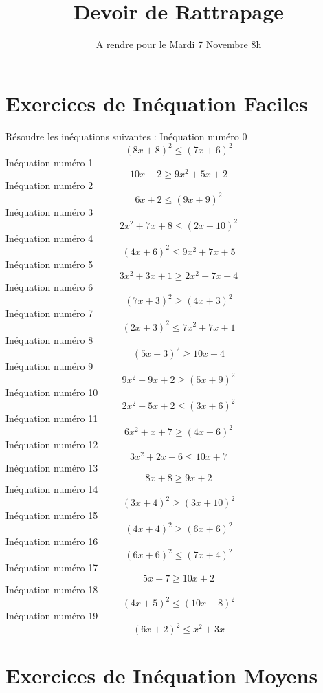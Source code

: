 \documentclass{article}
\title{Devoir de Rattrapage}
\date{A rendre pour le Mardi 7 Novembre 8h}\usepackage{natbib}
\begin{document}
\maketitle
 \section{Exercices de In\'equation Faciles}

 R\'esoudre les in\'equations suivantes : 
In\'equation num\'ero 0 \[\left(8 x + 8\right)^{2} \leq \left(7 x + 6\right)^{2}\]In\'equation num\'ero 1 \[10 x + 2 \geq 9 x^{2} + 5 x + 2\]In\'equation num\'ero 2 \[6 x + 2 \leq \left(9 x + 9\right)^{2}\]In\'equation num\'ero 3 \[2 x^{2} + 7 x + 8 \leq \left(2 x + 10\right)^{2}\]In\'equation num\'ero 4 \[\left(4 x + 6\right)^{2} \leq 9 x^{2} + 7 x + 5\]In\'equation num\'ero 5 \[3 x^{2} + 3 x + 1 \geq 2 x^{2} + 7 x + 4\]In\'equation num\'ero 6 \[\left(7 x + 3\right)^{2} \geq \left(4 x + 3\right)^{2}\]In\'equation num\'ero 7 \[\left(2 x + 3\right)^{2} \leq 7 x^{2} + 7 x + 1\]In\'equation num\'ero 8 \[\left(5 x + 3\right)^{2} \geq 10 x + 4\]In\'equation num\'ero 9 \[9 x^{2} + 9 x + 2 \geq \left(5 x + 9\right)^{2}\]In\'equation num\'ero 10 \[2 x^{2} + 5 x + 2 \leq \left(3 x + 6\right)^{2}\]In\'equation num\'ero 11 \[6 x^{2} + x + 7 \geq \left(4 x + 6\right)^{2}\]In\'equation num\'ero 12 \[3 x^{2} + 2 x + 6 \leq 10 x + 7\]In\'equation num\'ero 13 \[8 x + 8 \geq 9 x + 2\]In\'equation num\'ero 14 \[\left(3 x + 4\right)^{2} \geq \left(3 x + 10\right)^{2}\]In\'equation num\'ero 15 \[\left(4 x + 4\right)^{2} \geq \left(6 x + 6\right)^{2}\]In\'equation num\'ero 16 \[\left(6 x + 6\right)^{2} \leq \left(7 x + 4\right)^{2}\]In\'equation num\'ero 17 \[5 x + 7 \geq 10 x + 2\]In\'equation num\'ero 18 \[\left(4 x + 5\right)^{2} \leq \left(10 x + 8\right)^{2}\]In\'equation num\'ero 19 \[\left(6 x + 2\right)^{2} \leq x^{2} + 3 x\]
 \section{Exercices de In\'equation Moyens}
\end{document}
